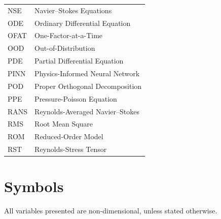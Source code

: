 \begin{longtable}{p{2.5cm}p{10cm}}
    NSE    & Navier--Stokes Equations \\
    ODE    & Ordinary Differential Equation \\
    OFAT   & One-Factor-at-a-Time \\
    OOD    & Out-of-Distribution \\
    PDE    & Partial Differential Equation \\
    PINN   & Physics-Informed Neural Network \\
    POD    & Proper Orthogonal Decomposition \\
    PPE    & Pressure-Poisson Equation \\
    RANS   & Reynolds-Averaged Navier--Stokes \\
    RMS    & Root Mean Square \\
    ROM    & Reduced-Order Model \\
    RST    & Reynolds-Stress Tensor \\
    \bottomrule
\end{longtable}

\pagebreak
\section*{Symbols}
All variables presented are non-dimensional, unless stated otherwise.

